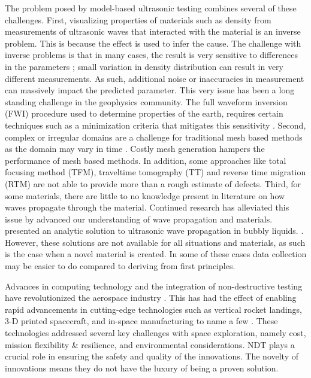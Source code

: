 The problem posed by model-based ultrasonic testing combines several of these challenges. First, visualizing properties of materials such as density from measurements of ultrasonic waves that interacted with the material is an inverse problem. This is because the effect is used to infer the cause. The challenge with inverse problems is that in many cases, the result is very sensitive to differences in the parameters \autocite{tarantolaInverseProblemTheory2005}; small variation in density distribution can result in very different measurements. As such, additional noise or inaccuracies in measurement can massively impact the predicted parameter. This very issue has been a long standing challenge in the geophysics community. The full waveform inversion (FWI) procedure used to determine properties of the earth, requires certain techniques such as a minimization criteria that mitigates this sensitivity \autocite{virieuxOverviewFullwaveformInversion2009}. Second, complex or irregular domains are a challenge for traditional mesh based methods as the domain may vary in time \autocite{liImmersedInterfaceMethod2006, burchnerImmersedBoundaryParametrizations2023}. Costly mesh generation hampers the performance of mesh based methods. In addition, some approaches like total focusing method (TFM), traveltime tomography (TT) and reverse time migration (RTM) are not able to provide more than a rough estimate of defects. Third, for some materials, there are little to no knowledge present in literature on how waves propagate through the material. Continued research has alleviated this issue by advanced our understanding of wave propagation and materials. \textcite{gordoaUltrasonicWavesBubbly2021} presented an analytic solution to ultrasonic wave propagation in bubbly liquids. \textcite{} . However, these solutions are not available for all situations and materials, as such is the case when a novel material is created. In some of these cases data collection may be easier to do compared to deriving from first principles.

Advances in computing technology and the integration of non-destructive testing have revolutionized the aerospace industry \autocite{guptaAdvancesApplicationsNonDestructive2022, jacobDataFusionEfficient2022}. This has had the effect of enabling rapid advancements in cutting-edge technologies such as vertical rocket landings, 3-D printed spacecraft, and in-space manufacturing to name a few \autocite{corradoSpaceExplorationEconomic2023}. These technologies addressed several key challenges with space exploration, namely cost, mission flexibility \& resilience, and environmental considerations. NDT plays a crucial role in ensuring the safety and quality of the innovations. The novelty of innovations means they do not have the luxury of being a proven solution.

